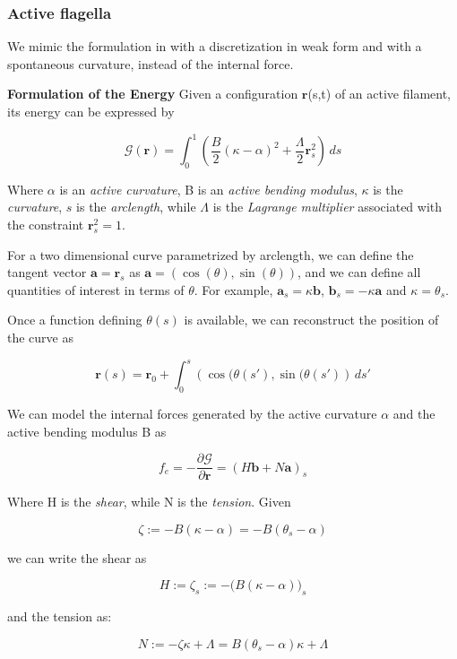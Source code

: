 
\subsubsection{Active flagella}
We mimic the formulation in \cite{julicher} with a discretization in weak form and with a spontaneous curvature, instead of the internal force.



\textbf{Formulation of the Energy}
Given a configuration $\mathbf{r}$(s,t) of an active filament, its energy can be expressed by

\[\mathcal{G}(\mathbf{r}) = \int_0^1 \left( \frac{B}{2}(\kappa-\alpha)^2 +
  \frac{\Lambda}{2} \mathbf{r}_s^2 \right) \,d s\]

Where $\alpha$ is an \emph{active curvature}, B is an \emph{active
  bending modulus}, $\kappa$ is the \emph{curvature}, $s$ is the
\emph{arclength}, while $\Lambda$ is the \emph{Lagrange multiplier}
associated with the constraint $\mathbf{r}_s^2 = 1$.

For a two dimensional curve parametrized by arclength, we can define
the tangent vector $\mathbf{a} = \mathbf{r}_s$ as $\mathbf{a} = (\cos(\theta), \sin(\theta))$, and
we can define all quantities of interest in terms of $\theta$. For
example, $\mathbf{a}_s = \kappa \mathbf{b}$, $\mathbf{b}_s = -\kappa \mathbf{a}$ and $\kappa = \theta_s$.

Once a function defining \(\theta(s)\) is available, we can reconstruct
the position of the curve as

\[\mathbf{r}(s) = \mathbf{r}_0 + \int_0^s \left(\cos(\theta(s'), \sin(\theta(s') \right)
\,d s'\]

We can model the internal forces generated by the active curvature
$\alpha$ and the active bending modulus B as

\[f_e = -\frac{\partial \mathcal{G}}{\partial \mathbf{r}} = (H \mathbf{b} + N \mathbf{a})_s\]

Where H is the \emph{shear}, while N is the
\emph{tension}. Given 

\[\zeta := -B(\kappa - \alpha) = -B(\theta_s - \alpha)\]

we can write the shear as

\[H := \zeta_s := -\big( B(\kappa - \alpha) \big)_s\]

and the tension as:

\[N := -\zeta\kappa + \Lambda = B(\theta_s-\alpha)\kappa +\Lambda\]

\\\\

